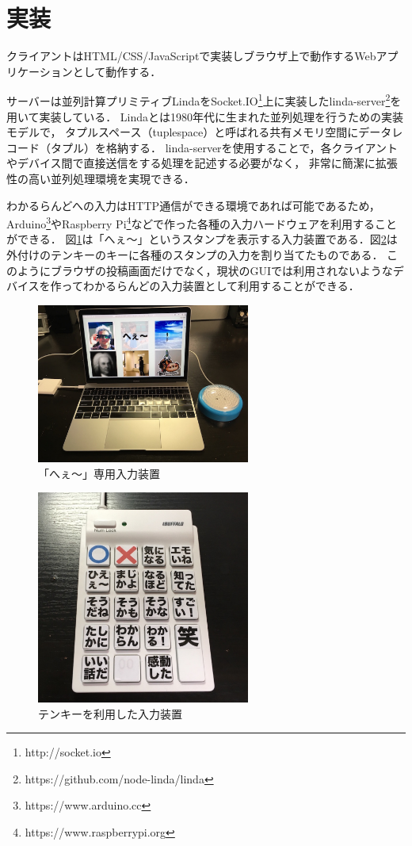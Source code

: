 \section{実装}

クライアントはHTML/CSS/JavaScriptで実装しブラウザ上で動作するWebアプリケーションとして動作する．

サーバーは並列計算プリミティブLindaをSocket.IO\footnote{http://socket.io}上に実装したlinda-server\footnote{https://github.com/node-linda/linda}を用いて実装している．
Lindaとは1980年代に生まれた並列処理を行うための実装モデルで，
タプルスペース（tuplespace）と呼ばれる共有メモリ空間にデータレコード（タプル）を格納する．
linda-serverを使用することで，各クライアントやデバイス間で直接送信をする処理を記述する必要がなく，
非常に簡潔に拡張性の高い並列処理環境を実現できる．

わかるらんどへの入力はHTTP通信ができる環境であれば可能であるため，
Arduino\footnote{https://www.arduino.cc}やRaspberry Pi\footnote{https://www.raspberrypi.org}などで作った各種の入力ハードウェアを利用することができる．
図\ref{button}は「へぇ〜」というスタンプを表示する入力装置である．図\ref{10key}は外付けのテンキーのキーに各種のスタンプの入力を割り当てたものである．
このようにブラウザの投稿画面だけでなく，現状のGUIでは利用されないようなデバイスを作ってわかるらんどの入力装置として利用することができる．

\begin{figure}[h]
\centering
\includegraphics[width=7cm]{images/button.eps}
\caption{「へぇ〜」専用入力装置}
\label{button}
\end{figure}

\begin{figure}[h]
\centering
\includegraphics[width=7cm]{images/10key.eps}
\caption{テンキーを利用した入力装置}
\label{10key}
\end{figure}